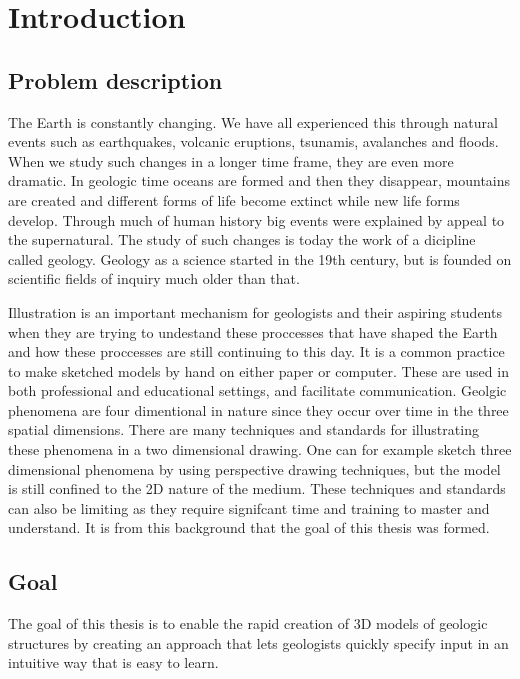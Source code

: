 \documentclass[a4paper,12pt]{report}
\begin{document}
\clearpage

\tableofcontents 



\clearpage


\chapter{Introduction}
\label{sec:intro}

\section{Problem description}
The Earth is constantly changing. We have all experienced this through natural events such as earthquakes, volcanic eruptions, tsunamis, avalanches and floods. When we study such changes in a longer time frame, they are even more dramatic. In geologic time oceans are formed and then they disappear, mountains are created and different forms of life become extinct while new life forms develop. Through much of human history big events were explained by appeal to the supernatural. The study of such changes is today the work of a dicipline called geology. Geology as a science started in the 19th century, but is founded on scientific fields of inquiry much older than that.

Illustration is an important mechanism for geologists and their aspiring students when they are trying to undestand these proccesses that have shaped the Earth and how these proccesses are still continuing to this day. It is a common practice to make sketched models by hand on either paper or computer. These are used in both professional and educational settings, and facilitate communication. Geolgic phenomena are four dimentional in nature since they occur over time in the three spatial dimensions. There are many techniques and standards for illustrating these phenomena in a two dimensional drawing. One can for example sketch three dimensional phenomena by using perspective drawing techniques, but the model is still confined to the 2D nature of the medium. These techniques and standards can also be limiting  as they require signifcant time and training to master and understand. It is from this background that the goal of this thesis was formed. 

\section{Goal}
The goal of this thesis is to enable the rapid creation of 3D models of geologic structures by creating an approach that lets geologists quickly specify input in an intuitive way that is easy to learn.
\end{document}
